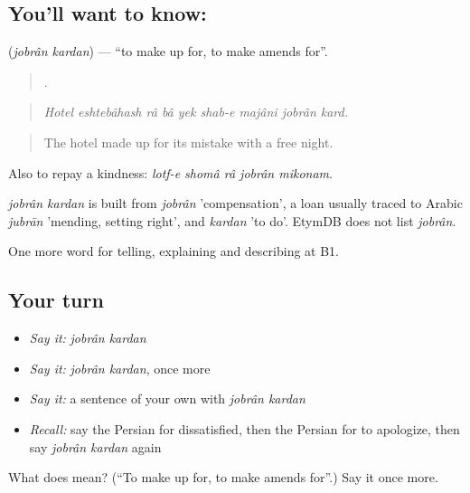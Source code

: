 \subsection*{You'll want to know:  }
\textbf{ } (\emph{jobrân kardan}) — \textquotedblleft{}to make up for, to make amends for\textquotedblright{}.

\begin{quote}
        .
\end{quote}

\begin{quote}
\emph{Hotel eshtebâhash râ bâ yek shab-e majâni jobrân kard.}
\end{quote}

\begin{quote}
The hotel made up for its mistake with a free night.
\end{quote}

Also to repay a kindness: \emph{lotf-e shomâ râ jobrân mikonam}.

\begin{cousinweb}
\emph{jobrân kardan} is built from \emph{jobrân} 'compensation', a loan usually traced to Arabic \emph{jubrān} 'mending, setting right', and \emph{kardan} 'to do'. EtymDB does not list \emph{jobrân}.
\end{cousinweb}

\begin{grammarlens}[title={What you've built}]
One more word for telling, explaining and describing at B1.
\end{grammarlens}

\subsection*{Your turn}
\begin{itemize}
\raggedright
  \item \emph{Say it:} \emph{jobrân kardan}
  \item \emph{Say it:} \emph{jobrân kardan}, once more
  \item \emph{Say it:} a sentence of your own with \emph{jobrân kardan}
  \item \emph{Recall:} say the Persian for dissatisfied, then the Persian for to apologize, then say \emph{jobrân kardan} again
\end{itemize}

\begin{tcolorbox}[breakable,colback=teal!4,colframe=teal!35!black,title={Before you move on}]
What does   mean? (\textquotedblleft{}To make up for, to make amends for\textquotedblright{}.) Say it once more.
\end{tcolorbox}
